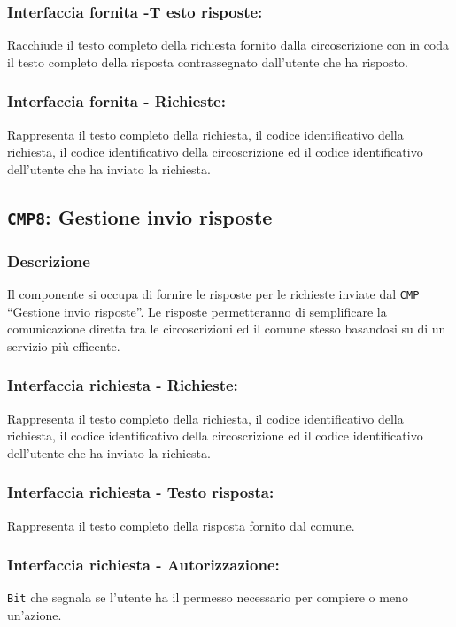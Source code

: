         \subsubsection{Interfaccia fornita -T esto risposte:}
            Racchiude il testo completo della richiesta fornito dalla circoscrizione con in coda il testo completo della risposta contrassegnato dall'utente che ha risposto.
        \subsubsection{Interfaccia fornita - Richieste:}
            Rappresenta il testo completo della richiesta, il codice identificativo della richiesta, il codice identificativo della circoscrizione ed il codice identificativo dell'utente che ha inviato la richiesta.

    \subsection{\texttt{CMP8}: Gestione invio risposte}
        \subsubsection{Descrizione}
            Il componente si occupa di fornire le risposte per le richieste inviate dal \texttt{CMP} ``Gestione invio risposte''. Le risposte permetteranno di semplificare la comunicazione diretta tra le circoscrizioni ed il comune stesso basandosi su di un servizio più efficente.
        \subsubsection{Interfaccia richiesta - Richieste:}
            Rappresenta il testo completo della richiesta, il codice identificativo della richiesta, il codice identificativo della circoscrizione ed il codice identificativo dell'utente che ha inviato la richiesta.
        \subsubsection{Interfaccia richiesta - Testo risposta:}
            Rappresenta il testo completo della risposta fornito dal comune.
        \subsubsection{Interfaccia richiesta - Autorizzazione:}
            \texttt{Bit} che segnala se l'utente ha il permesso necessario per compiere o meno un'azione.
